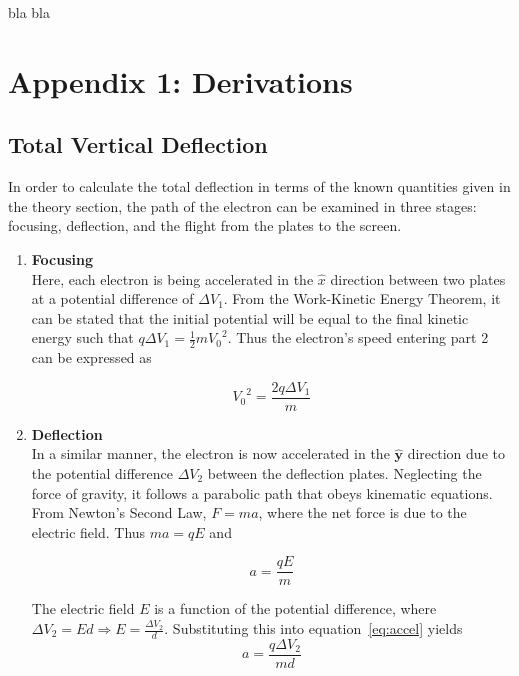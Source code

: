 \documentclass[twocolumn,english,amsmath,amssymb]{IEEEtran}
\theoremstyle{plain}
\theoremstyle{plain}
\begin{document}
bla bla


\appendices{}

\section{Appendix 1: Derivations}

\subsection{Total Vertical Deflection}
In order to calculate the total deflection in terms of the known quantities given in the theory section, the path of the electron can be examined in three stages: focusing, deflection, and the flight from the plates to the screen.
\begin{enumerate}
 \item \textbf{Focusing} \\
 Here, each electron is being accelerated in the $\hat{x}$ direction between two plates at a potential difference of $\Delta V_1$. From the Work-Kinetic Energy Theorem, it can be stated that the initial potential will be equal to the final kinetic energy such that $q \Delta V_1 = \frac{1}{2}m{V_0}^2$. Thus the electron's speed entering part 2 can be expressed as

 \begin{equation} \label{eq:v0}
 {V_0}^2 = \frac{2q\Delta V_1}{m}
 \end{equation}

 \item \textbf{Deflection} \\
 In a similar manner, the electron is now accelerated in the $\mathbf{\hat{y}}$ direction due to the potential difference $\Delta V_2$ between the deflection plates. Neglecting the force of gravity, it follows a parabolic path that obeys kinematic equations. From Newton's Second Law, $F=ma$, where the net force is due to the electric field. Thus $ma = qE$ and

 \begin{equation} \label{eq:accel}
 a = \frac{qE}{m}
 \end{equation}

 The electric field $E$ is a function of the potential difference, where $\Delta V_2 = Ed \Rightarrow E = \frac{\Delta V_2}{d}.$ Substituting this into equation~\ref{eq:accel} yields
 \begin{equation} \label{eq:accel2}
 a = \frac{q\Delta V_2}{md}
 \end{equation}


\end{enumerate}
\end{document}
